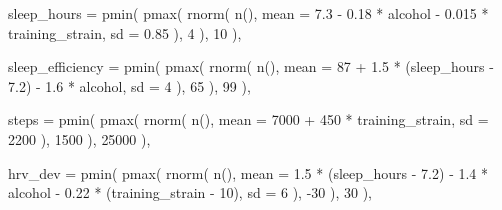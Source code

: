 \documentclass[
  letterpaper,
  DIV=11,
  numbers=noendperiod]{scrreprt}
\newenvironment{Shaded}{\begin{snugshade}}{\end{snugshade}}
\newcommand{\AttributeTok}[1]{\textcolor[rgb]{0.40,0.45,0.13}{#1}}
\newcommand{\DecValTok}[1]{\textcolor[rgb]{0.68,0.00,0.00}{#1}}
\newcommand{\FloatTok}[1]{\textcolor[rgb]{0.68,0.00,0.00}{#1}}
\newcommand{\FunctionTok}[1]{\textcolor[rgb]{0.28,0.35,0.67}{#1}}
\newcommand{\NormalTok}[1]{\textcolor[rgb]{0.00,0.23,0.31}{#1}}
\newcommand{\SpecialCharTok}[1]{\textcolor[rgb]{0.37,0.37,0.37}{#1}}
\begin{document}
\begin{Shaded}
\begin{Highlighting}[]
      \AttributeTok{sleep\_hours =} \FunctionTok{pmin}\NormalTok{(}
        \FunctionTok{pmax}\NormalTok{(}
          \FunctionTok{rnorm}\NormalTok{(}
            \FunctionTok{n}\NormalTok{(),}
            \AttributeTok{mean =} \FloatTok{7.3} \SpecialCharTok{{-}}
              \FloatTok{0.18} \SpecialCharTok{*}\NormalTok{ alcohol }\SpecialCharTok{{-}}
              \FloatTok{0.015} \SpecialCharTok{*}\NormalTok{ training\_strain,}
            \AttributeTok{sd =} \FloatTok{0.85}
\NormalTok{          ),}
          \DecValTok{4}
\NormalTok{        ),}
        \DecValTok{10}
\NormalTok{      ),}

      \AttributeTok{sleep\_efficiency =} \FunctionTok{pmin}\NormalTok{(}
        \FunctionTok{pmax}\NormalTok{(}
          \FunctionTok{rnorm}\NormalTok{(}
            \FunctionTok{n}\NormalTok{(),}
            \AttributeTok{mean =} \DecValTok{87} \SpecialCharTok{+}
              \FloatTok{1.5} \SpecialCharTok{*}\NormalTok{ (sleep\_hours }\SpecialCharTok{{-}} \FloatTok{7.2}\NormalTok{) }\SpecialCharTok{{-}}
              \FloatTok{1.6} \SpecialCharTok{*}\NormalTok{ alcohol,}
            \AttributeTok{sd =} \DecValTok{4}
\NormalTok{          ),}
          \DecValTok{65}
\NormalTok{        ),}
        \DecValTok{99}
\NormalTok{      ),}

      \AttributeTok{steps =} \FunctionTok{pmin}\NormalTok{(}
        \FunctionTok{pmax}\NormalTok{(}
          \FunctionTok{rnorm}\NormalTok{(}
            \FunctionTok{n}\NormalTok{(),}
            \AttributeTok{mean =} \DecValTok{7000} \SpecialCharTok{+} \DecValTok{450} \SpecialCharTok{*}\NormalTok{ training\_strain,}
            \AttributeTok{sd =} \DecValTok{2200}
\NormalTok{          ),}
          \DecValTok{1500}
\NormalTok{        ),}
        \DecValTok{25000}
\NormalTok{      ),}

      \AttributeTok{hrv\_dev =} \FunctionTok{pmin}\NormalTok{(}
        \FunctionTok{pmax}\NormalTok{(}
          \FunctionTok{rnorm}\NormalTok{(}
            \FunctionTok{n}\NormalTok{(),}
            \AttributeTok{mean =} \FloatTok{1.5} \SpecialCharTok{*}\NormalTok{ (sleep\_hours }\SpecialCharTok{{-}} \FloatTok{7.2}\NormalTok{) }\SpecialCharTok{{-}}
              \FloatTok{1.4} \SpecialCharTok{*}\NormalTok{ alcohol }\SpecialCharTok{{-}}
              \FloatTok{0.22} \SpecialCharTok{*}\NormalTok{ (training\_strain }\SpecialCharTok{{-}} \DecValTok{10}\NormalTok{),}
            \AttributeTok{sd =} \DecValTok{6}
\NormalTok{          ),}
          \SpecialCharTok{{-}}\DecValTok{30}
\NormalTok{        ),}
        \DecValTok{30}
\NormalTok{      ),}


\end{Highlighting}
\end{Shaded}
\end{document}
